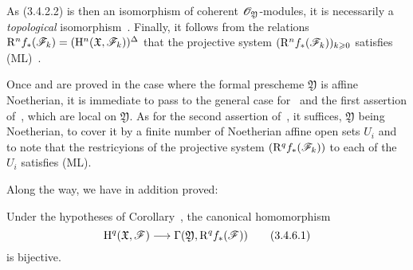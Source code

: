 \begin{env}[3.4.5]
As (3.4.2.2) is then an isomorphism of coherent $\mathscr{O}_\mathfrak{Y}$-modules, it is necessarily a \emph{topological} isomorphism~.
Finally, it follows from the relations $\mathrm{R}^n f_*(\mathscr{F}_k)=(\mathrm{H}^n(\mathfrak{X},\mathscr{F}_k))^\Delta$ that the projective system $(\mathrm{R}^n f_*(\mathscr{F}_k))_{k\geqslant 0}$ satisfies (ML)~.

Once  and  are proved in the case where the formal prescheme $\mathfrak{Y}$ is affine Noetherian, it is immediate to pass to the general case for~ and the first assertion of~, which are local on $\mathfrak{Y}$.
As for the second assertion of~, it suffices, $\mathfrak{Y}$ being Noetherian, to cover it by a finite number of Noetherian affine open sets $U_i$ and to note that the restricyions of the projective system $(\mathrm{R}^q f_*(\mathscr{F}_k))$ to each of the $U_i$ satisfies (ML).
\end{env}

Along the way, we have in addition proved:
\begin{corollary}[3.4.6]
\label{3.3.4.6}
Under the hypotheses of Corollary~, the canonical homomorphism
\[
\label{eq:3.3.4.6.1}
  \HH^q(\mathfrak{X},\sh{F})\to\Gamma(\mathfrak{Y},\RR^q f_*(\sh{F}))
  \tag{3.4.6.1}
\]
is bijective.
\end{corollary}

